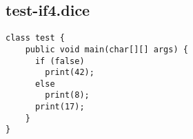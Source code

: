 \subsection{test-if4.dice}
\begin{verbatim}
class test {
	public void main(char[][] args) {
	  if (false) 
	  	print(42); 
	  else 
	  	print(8);
  	  print(17);
	}
}

\end{verbatim}